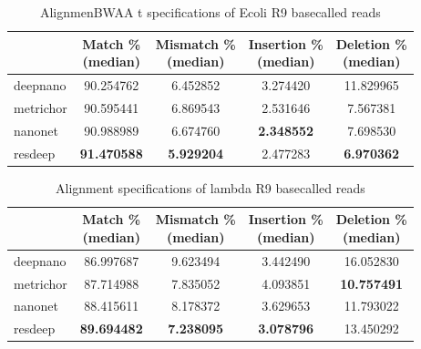 \documentclass[times, utf8, diplomski, numeric, english]{fer}
\begin{document}
\begin{table}[htb]
	\caption{AlignmenBWAA t specifications of Ecoli R9 basecalled reads}
	\label{tbl:lambda_rates_bwa}
	\centering
	\begin{tabular}{lcccc}
		\toprule
		{} &  \thead{Match \% \\(median)} &  \thead{Mismatch \% \\(median)} &  \thead{Insertion \% \\(median)} &  \thead{Deletion \% \\(median)} \\
		\midrule
		deepnano   &                  90.254762 &                      6.452852 &                       3.274420 &                     11.829965 \\
		metrichor  &                  90.595441 &                      6.869543 &                       2.531646 &                      7.567381 \\
		nanonet    &                  90.988989 &                      6.674760 &                     \textbf{  2.348552} &                      7.698530 \\
		resdeep    &                 \textbf{ 91.470588} &                      \textbf{5.929204 }&                       2.477283 &                     \textbf{ 6.970362} \\
		\bottomrule
	\end{tabular}
	
\end{table}
\begin{table}[htb]
	\caption{Alignment specifications of lambda R9 basecalled reads}
	\label{tbl:lambda_rates}
	\centering
	\begin{tabular}{lcccc}
		\toprule
		{} &  \thead{Match \% \\(median)} &  \thead{Mismatch \% \\(median)} &  \thead{Insertion \% \\(median)} &  \thead{Deletion \% \\(median)} \\
		\midrule
		deepnano   &                  86.997687 &                      9.623494 &                       3.442490 &                     16.052830 \\
		metrichor  &                  87.714988 &                      7.835052 &                       4.093851 &                     \textbf{10.757491} \\
		nanonet    &                  88.415611 &                      8.178372 &                       3.629653 &                     11.793022 \\
		resdeep    &                 \textbf{ 89.694482} &                     \textbf{ 7.238095} &                       \textbf{3.078796} &                     13.450292 \\
		\bottomrule
	\end{tabular}




\end{table}
\end{document}
